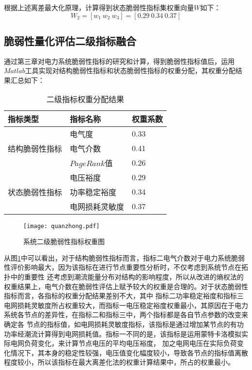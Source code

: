 根据上述离差最大化原理，计算得到状态脆弱性指标集权重向量$W$如下：
\begin{equation}
  \label{equ:chap4:quanzhong2}
    W_2 = \left[w_{1}\ w_{2}\ w_{3}\right]=[0.29\ 0.34\ 0.37]
    \end{equation}


\subsection{脆弱性量化评估二级指标融合}
\label{sec:2ndIndexMerge}

通过第三章对电力系统脆弱性指标的研究和计算，得到脆弱性指标值后，运用$Matlab$工具实现对结构脆弱性指标和状态脆弱性指标的权重分配，其权重分配结果汇总如下：
\begin{table}[htb]
  \centering
  \caption{二级指标权重分配结果}
  \label{tab:quanzhong3}
    \begin{tabular}{C{3.5cm}C{3.5cm}C{3.5cm}}
      \toprule
      指标类型 & 指标名称 & 权重系数 \\
      \midrule
                    & 电气度  &  0.33 \\
      结构脆弱性指标 & 电气介数 & 0.41 \\
                    & $PageRank$值 & 0.26 \\
                    & 电压裕度  &  0.29 \\
      状态脆弱性指标 & 功率稳定裕度 & 0.34 \\
                    & 电网损耗灵敏度 & 0.37 \\ 
      \bottomrule
    \end{tabular}
\end{table}

\begin{figure}[H] %
  \centering
  \texttt{[image: quanzhong.pdf]}
  \caption{系统二级脆弱性指标权重图}
  \label{fig:quanzhong}
\end{figure}

从图\ref{fig:quanzhong}中可以看出，对于结构脆弱性指标而言，指标二电气介数对于电力系统脆弱性评价影响最大，因为该指标在进行节点重要性分析时，不仅考虑到系统节点在拓扑中的重要性
还考虑到潮流能量分布对结构的影响程度，所以从改进的熵权法的权重结果上，电气介数在脆弱性评估上赋予较大的权重是合理的。对于状态脆弱性指标而言，各指标的权重分配结果差别不大，其中
指标二功率稳定裕度和指标三电网损耗灵敏度所占权重较大，而指标一电压稳定裕度权重最小，其原因在于电力系统各节点的差异性，在指标二和指标三中，两个指标都是各自节点参数的改变来确定各
节点的指标值，如电网损耗灵敏度指标，该指标是通过增加某节点的有功功率经潮流计算得到电网损耗值。指标一不同的是，该指标是运用蒙特卡洛模拟实际电网负荷变化，来计算节点电压的平均电压裕度，
加之电网电压在实际负荷变化情况下，其本身的稳定性较强，电压值变化幅度较小，导致各节点的指标值离散程度较小，所以该指标在最大离差化法的权重计算结果中，所占的权重最小。

